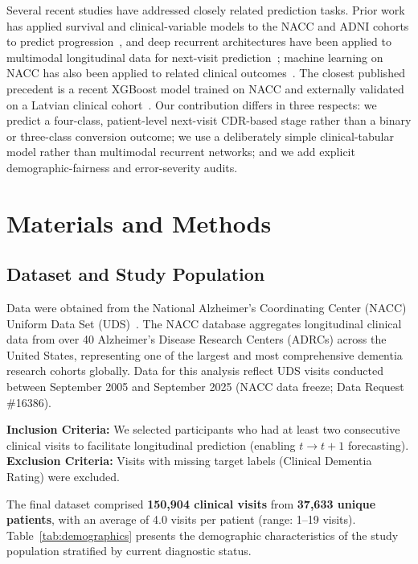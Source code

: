 \documentclass[preprint,12pt]{elsarticle}
\begin{document}
Several recent studies have addressed closely related prediction tasks. Prior work has applied survival and clinical-variable models to the NACC and ADNI cohorts to predict progression~\cite{pang2023,song2023,arnold2025}, and deep recurrent architectures have been applied to multimodal longitudinal data for next-visit prediction~\cite{alolaimat2023}; machine learning on NACC has also been applied to related clinical outcomes~\cite{yew2024}. The closest published precedent is a recent XGBoost model trained on NACC and externally validated on a Latvian clinical cohort~\cite{kannenieks2026}. Our contribution differs in three respects: we predict a four-class, patient-level next-visit CDR-based stage rather than a binary or three-class conversion outcome; we use a deliberately simple clinical-tabular model rather than multimodal recurrent networks; and we add explicit demographic-fairness and error-severity audits.

\section{Materials and Methods}

\subsection{Dataset and Study Population}

Data were obtained from the National Alzheimer's Coordinating Center (NACC) Uniform Data Set (UDS)~\cite{nacc2022}. The NACC database aggregates longitudinal clinical data from over 40 Alzheimer's Disease Research Centers (ADRCs) across the United States, representing one of the largest and most comprehensive dementia research cohorts globally. Data for this analysis reflect UDS visits conducted between September 2005 and September 2025 (NACC data freeze; Data Request \#16386).

\textbf{Inclusion Criteria:} We selected participants who had at least two consecutive clinical visits to facilitate longitudinal prediction (enabling $t \rightarrow t+1$ forecasting). \textbf{Exclusion Criteria:} Visits with missing target labels (Clinical Dementia Rating) were excluded.

The final dataset comprised \textbf{150,904 clinical visits} from \textbf{37,633 unique patients}, with an average of 4.0 visits per patient (range: 1--19 visits). Table~\ref{tab:demographics} presents the demographic characteristics of the study population stratified by current diagnostic status.
\end{document}
